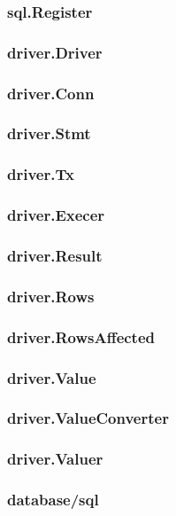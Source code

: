 
\subsubsection{sql.Register}

\subsubsection{driver.Driver}

\subsubsection{driver.Conn}

\subsubsection{driver.Stmt}

\subsubsection{driver.Tx}

\subsubsection{driver.Execer}

\subsubsection{driver.Result}

\subsubsection{driver.Rows}

\subsubsection{driver.RowsAffected}

\subsubsection{driver.Value}

\subsubsection{driver.ValueConverter}

\subsubsection{driver.Valuer}

\subsubsection{database/sql}


